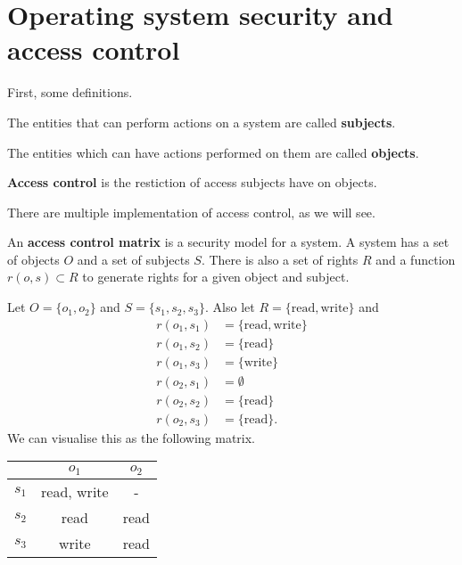 \chapter{Operating system security and access control}

First, some definitions.

\begin{definition}[Subjects]
    The entities that can perform actions on a system are called \textbf{subjects}.
\end{definition}

\begin{definition}[Objects]
    The entities which can have actions performed on them are called \textbf{objects}.
\end{definition}

\begin{definition}
    \textbf{Access control} is the restiction of access subjects have on objects.
\end{definition}

There are multiple implementation of access control, as we will see.

\begin{definition}
    An \textbf{access control matrix} is a security model for a system. A system has a set of objects $O$ and a set of subjects $S$. There is also a set of rights $R$ and a function $r(o, s) \subset R$ to generate rights for a given object and subject.
\end{definition}

\begin{example}
    Let $O = \{ o_1, o_2 \}$ and $S = \{ s_1, s_2, s_3 \}$. Also let $R = \{ \text{read}, \text{write} \}$ and
    \begin{align*}
        r(o_1, s_1) &= \{ \text{read}, \text{write} \} \\
        r(o_1, s_2) &= \{ \text{read} \} \\
        r(o_1, s_3) &= \{ \text{write} \} \\
        r(o_2, s_1) &= \emptyset \\
        r(o_2, s_2) &= \{ \text{read} \} \\
        r(o_2, s_3) &= \{ \text{read} \}.
    \end{align*}
    We can visualise this as the following matrix.
    \begin{center}
        \begin{tabular}{ccc}
            \toprule
            & $o_1$ & $o_2$ \\
            \midrule
            $s_1$ & read, write & - \\
            $s_2$ & read & read \\
            $s_3$ & write & read \\
            \bottomrule
        \end{tabular}
    \end{center}
\end{example}

